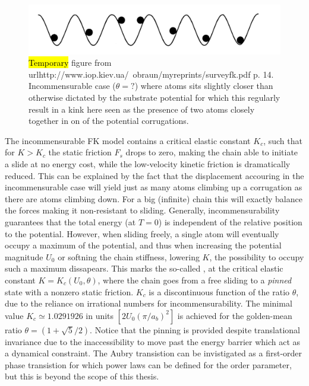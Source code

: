\begin{figure}[H]
  \centering
  \includegraphics[width=0.5\linewidth]{figures/theory/incommensurable_example.png}
  \caption{\hl{Temporary} figure from
  url{http://www.iop.kiev.ua/~obraun/myreprints/surveyfk.pdf} p. 14.
  Incommensurable case ($\theta = ?$) where atoms sits slightly closer than
  otherwise dictated by the substrate potential for which this regularly result
  in a kink here seen as the presence of two atoms closely together in on of the
  potential corrugations.}
  \label{fig:incommensurable_example}
\end{figure}


The incommensurable \acrshort{FK} model contains a critical elastic constant $K_c$, such that for $K > K_c$ the static friction $F_s$ drops to zero, making the chain able to initiate a slide at no energy cost, while the low-velocity kinetic friction is dramatically reduced. This can be explained by the
fact that the displacement accouring in the incommensurable case will yield just
as many atoms climbing up a corrugation as there are atoms climbing down. For a big (infinite) chain this will exactly balance the forces making it
non-resistant to sliding. Generally, incommensurability guarantees that the
total energy (at $T=0$) is independent of the relative position to the
potential. However, when sliding freely, a single atom will eventually occupy a
maximum of the potential, and thus when increasing the potential magnitude $U_0$ or
softning the chain stiffness, lowering $K$, the possibility to occupy such a
maximum dissapears. This marks the so-called ,
at the critical elastic constant $K = K_c(U_0, \theta)$, where the chain goes
from a free sliding to a \textit{pinned} state with a nonzero static friction.
$K_c$ is a discontinuous function of the ratio $\theta$, due to the reliance on
irrational numbers for incommensurability. The minimal
value $K_c \simeq 1.0291926 $ in units $[2 U_0 (\pi / a_b)^2]$ is achieved for
the golden-mean ratio $\theta = (1+\sqrt{5}/2)$. Notice that the pinning is
provided despite translational invariance due to the inaccessibility to move
past the energy barrier which act as a dynamical constraint. The Aubry transistion can be invistigated as a first-order phase transistion for which power laws can be defined for the order parameter, but this is beyond the scope of this thesis.

